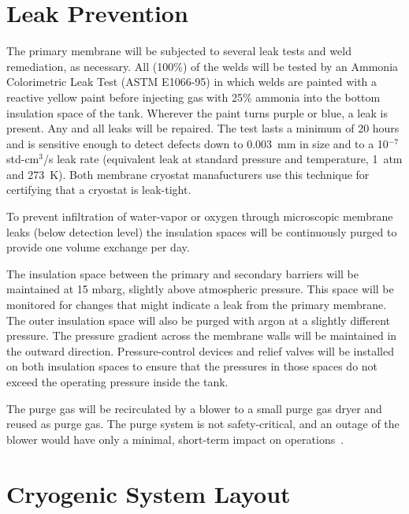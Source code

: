 \chapter{Leak Prevention}
\label{sec:cryo-cryosys-leak}

The primary membrane will be subjected to several leak tests 
and weld remediation, as necessary. All (100\%) of the welds 
will be tested by an Ammonia Colorimetric Leak Test (ASTM E1066-95) 
in which welds are painted with a reactive yellow paint before 
injecting gas with 25\% ammonia into the bottom insulation space 
of the tank.  Wherever the paint turns purple or blue, a leak 
is present. Any and all leaks will be repaired. The test lasts 
a minimum of 20 hours and is sensitive enough to detect defects down 
to 0.003~mm in size and to a 10$^{-7}$ std-cm$^3$/s leak 
rate (equivalent leak at standard pressure and temperature, 
1~atm and 273~K). Both membrane cryostat manafucturers use 
this technique for certifying that a cryostat is leak-tight.


To prevent infiltration of water-vapor or oxygen through 
microscopic membrane leaks (below detection level) the 
insulation spaces will be continuously purged to provide 
one volume exchange per day.  

The insulation space between the primary and 
secondary barriers will be maintained at 15 mbarg,  
slightly above atmospheric pressure. This space will
be monitored for changes that might indicate a leak 
from the primary membrane.  The outer insulation space 
will also be purged with argon at a slightly different 
pressure. The pressure gradient across the membrane walls 
will be maintained in the outward direction. Pressure-control 
devices and relief valves will be installed on both insulation 
spaces to ensure that the pressures in those spaces do not 
exceed the operating pressure inside the tank. 

The purge gas will be recirculated by a blower to a small 
purge gas dryer and reused as purge gas. The purge system 
is not safety-critical, and an outage of the blower would 
have only a minimal, short-term impact on operations~\cite{docdb4303}.

\chapter{Cryogenic System Layout}
\label{sec:cryo-cryosys-layout}

